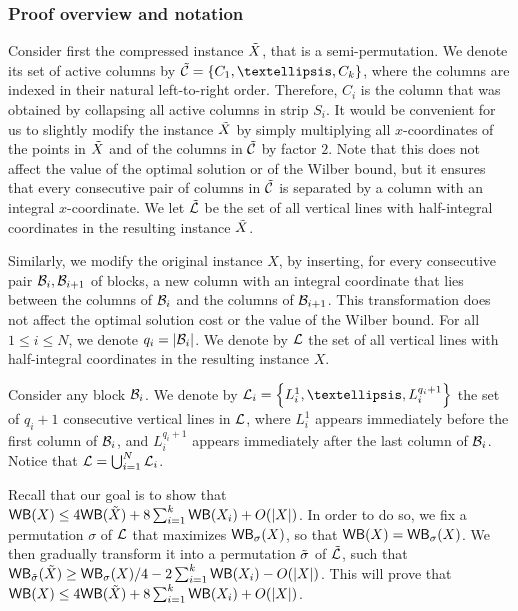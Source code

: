 \documentclass[11pt]{article}
\numberwithin{equation}{section}
\theoremstyle{definition}
\theoremstyle{plain}
\begin{document}
%
%
%
%
\subsubsection{Proof overview and notation}

%
%
%
%

Consider first the compressed instance $\tilde X$, that is a semi-permutation. We denote its set of active columns by $\tcset=\set{C_1,\ldots,C_k}$, where the columns are indexed in their natural left-to-right order. Therefore, $C_i$ is the column that was obtained by collapsing all active columns in strip $S_i$. %
%
%
%
%
It would be convenient for us to slightly modify the instance $\tilde X$ by simply multiplying all $x$-coordinates of the points in $\tilde X$ and of the columns in $\tilde{\mathcal{C}}$ by factor $2$. Note that this does not affect the value of the optimal solution or of the Wilber bound, but it ensures that every consecutive pair of columns in $\tilde{\mathcal{C}}$ is separated by a column with an integral $x$-coordinate. We let $\tilde{\mathcal{L}}$ be the set of all vertical lines with half-integral coordinates in the resulting instance $\tilde X$.

Similarly, we modify the original instance $X$, by inserting, for every consecutive pair ${\mathcal{B}}_i,{\mathcal{B}}_{i+1}$ of blocks, a new column with an integral coordinate that lies between the columns of ${\mathcal{B}}_{i}$ and the columns of ${\mathcal{B}}_{{i+1}}$. This transformation does not affect the optimal solution cost or the value of the Wilber bound. For all $1\leq i\leq N$, we denote $q_i=|{\mathcal{B}}_i|$.
%
We denote by ${\mathcal L}$ the set of all vertical lines with half-integral coordinates in the resulting instance $X$.

Consider any block ${\mathcal{B}}_i$. We denote by $\lset_i=\set{L_i^1,\ldots,L_i^{q_i+1}}$ the set of $q_i+1$ consecutive vertical lines in ${\mathcal L}$, where $L_i^1$ appears immediately before the first column of ${\mathcal{B}}_i$, and $L_i^{q_i+1}$ appears immediately after the last column of ${\mathcal{B}}_i$. Notice that ${\mathcal L}=\bigcup_{i=1}^N{\mathcal L}_i$.

Recall that our goal is to show that $\mathsf{WB}(X)\leq 4\mathsf{WB}(\tilde X)+8\sum_{i=1}^k\mathsf{WB}(X_i)+O(|X|)$. In order to do so, we fix a permutation $\sigma$ of ${\mathcal L}$ that maximizes $\mathsf{WB}_{\sigma}(X)$, so that $\mathsf{WB}(X)=\mathsf{WB}_{\sigma}(X)$. We then gradually transform it into a permutation $\tilde{\sigma}$ of $\tilde{\mathcal{L}}$, such that $\mathsf{WB}_{\tilde{\sigma}}(\tilde X)\geq \mathsf{WB}_{\sigma}(X)/4-2\sum_{i=1}^k\mathsf{WB}(X_i)-O(|X|)$. This will prove that $\mathsf{WB}(X)\leq 4\mathsf{WB}(\tilde X)+8\sum_{i=1}^k\mathsf{WB}(X_i)+O(|X|)$.
\end{document}
